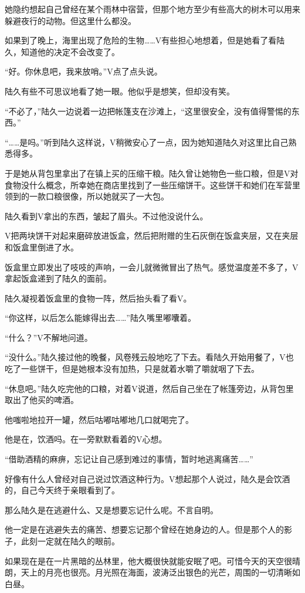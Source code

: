 她隐约想起自己曾经在某个雨林中宿营，但那个地方至少有些高大的树木可以用来躲避夜行的动物。但这里什么都没。

如果到了晚上，海里出现了危险的生物……V有些担心地想着，但是她看了看陆久，知道他的决定不会改变了。

“好。你休息吧，我来放哨。”V点了点头说。

陆久有些不可思议地看了她一眼。他似乎是想笑，但却没有笑。

“不必了，”陆久一边说着一边把帐篷支在沙滩上，“这里很安全，没有值得警惕的东西。”

“……是吗。”听到陆久这样说，V稍微安心了一点，因为她知道陆久对这里比自己熟悉得多。

于是她从背包里拿出了在镇上买的压缩干粮。陆久曾让她物色一些口粮，但是V对食物没什么概念，所幸她在商店里找到了一些压缩饼干。这些饼干和她们在军营里领到的一款口粮很像，所以她就买了一大包。

陆久看到V拿出的东西，皱起了眉头。不过他没说什么。

V把两块饼干对起来磨碎放进饭盒，然后把附赠的生石灰倒在饭盒夹层，又在夹层和饭盒里倒进了水。

饭盒里立即发出了吱吱的声响，一会儿就微微冒出了热气。感觉温度差不多了，V拿起饭盒递到了陆久的面前。

陆久凝视着饭盒里的食物一阵，然后抬头看了看V。

“你这样，以后怎么能嫁得出去……”陆久嘴里嘟囔着。

“什么？”V不解地问道。

“没什么。”陆久接过他的晚餐，风卷残云般地吃了下去。看陆久开始用餐了，V也吃了一些饼干，但是她根本没有加热，只是就着水嚼了嚼就咽了下去。

“休息吧。”陆久吃完他的口粮，对着V说道，然后自己坐在了帐篷旁边，从背包里取出了他买的啤酒。

他嗤啦地拉开一罐，然后咕嘟咕嘟地几口就喝完了。

他是在，饮酒吗。在一旁默默看着的V心想。

“借助酒精的麻痹，忘记让自己感到难过的事情，暂时地逃离痛苦……”

好像有什么人曾经对自己说过饮酒这种行为。V想起那个人说过，陆久是会饮酒的，自己今天终于亲眼看到了。

那么陆久是在逃避什么、又是想要忘记什么呢。不言自明。

他一定是在逃避失去的痛苦、想要忘记那个曾经在她身边的人。但是那个人的影子，此刻一定就在陆久的眼前。

如果现在是在一片黑暗的丛林里，他大概很快就能安眠了吧。可惜今天的天空很晴朗，天上的月亮也很亮。月光照在海面，波涛泛出银色的光芒，周围的一切清晰如白昼。

